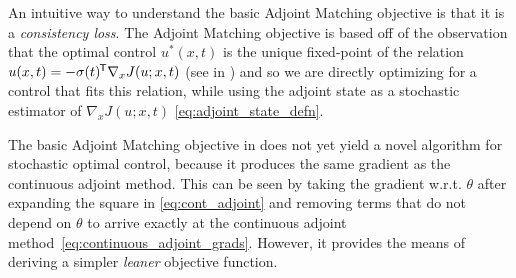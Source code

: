 \documentclass[]{fairmeta}
\newcommand*{\tran}{^{\mkern-1.5mu\mathsf{T}}}
\begin{document}
An intuitive way to understand the basic Adjoint Matching objective is that it is a \emph{consistency loss}. The Adjoint Matching objective is based off of the observation that the optimal control $u^*(x, t)$ is the unique fixed-point of the relation $u(x,t) = -\sigma(t)\tran{} \nabla_x J(u; x, t)$ (see  in )
and so we are directly optimizing for a control that fits this relation, while using the adjoint state as a stochastic estimator of $\nabla_x J(u; x, t)$ \eqref{eq:adjoint_state_defn}. 

The basic Adjoint Matching objective in  does not yet yield a novel algorithm for stochastic optimal control, because it produces the same gradient as the continuous adjoint method. This can be seen by taking the gradient w.r.t. $\theta$ after expanding the square in \eqref{eq:cont_adjoint} and removing terms that do not depend on $\theta$ to arrive exactly at the continuous adjoint method~\eqref{eq:continuous_adjoint_grads}. 
However, it provides the means of deriving a simpler \textit{leaner} objective function.
\end{document}
